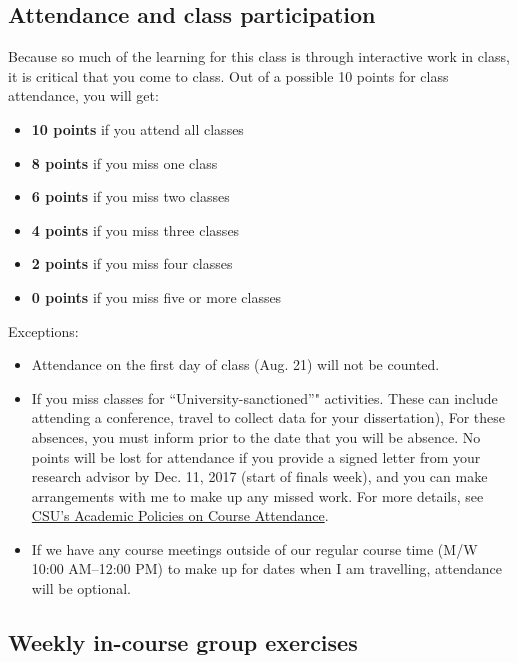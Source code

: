 \documentclass[]{book}
\providecommand{\tightlist}{%
  \setlength{\itemsep}{0pt}\setlength{\parskip}{0pt}}
\theoremstyle{definition}
\theoremstyle{definition}
\theoremstyle{definition}
\theoremstyle{remark}
\begin{document}
\subsection{Attendance and class
participation}\label{attendance-and-class-participation}

Because so much of the learning for this class is through interactive
work in class, it is critical that you come to class. Out of a possible
10 points for class attendance, you will get:

\begin{itemize}
\tightlist
\item
  \textbf{10 points} if you attend all classes
\item
  \textbf{8 points} if you miss one class
\item
  \textbf{6 points} if you miss two classes
\item
  \textbf{4 points} if you miss three classes
\item
  \textbf{2 points} if you miss four classes
\item
  \textbf{0 points} if you miss five or more classes
\end{itemize}

Exceptions:

\begin{itemize}
\tightlist
\item
  Attendance on the first day of class (Aug. 21) will not be counted.
\item
  If you miss classes for ``University-sanctioned''" activities. These
  can include attending a conference, travel to collect data for your
  dissertation), For these absences, you must inform prior to the date
  that you will be absence. No points will be lost for attendance if you
  provide a signed letter from your research advisor by Dec. 11, 2017
  (start of finals week), and you can make arrangements with me to make
  up any missed work. For more details, see
  \href{http://catalog.colostate.edu/general-catalog/academic-standards/academic-policies/}{CSU's
  Academic Policies on Course Attendance}.
\item
  If we have any course meetings outside of our regular course time (M/W
  10:00 AM--12:00 PM) to make up for dates when I am travelling,
  attendance will be optional.
\end{itemize}

\subsection{Weekly in-course group
exercises}\label{weekly-in-course-group-exercises}
\end{document}
